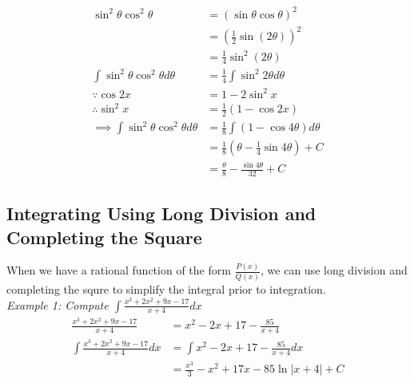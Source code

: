 \documentclass{article}
\begin{document}
        \begin{align*}
            \sin^2{\theta}\cos^2{\theta}                     &= (\sin{\theta}\cos{\theta})^2 \\
                                                             &= \left(\frac{1}{2}\sin{(2\theta)}\right)^2 \\
                                                             &= \frac{1}{4}\sin^2{(2\theta)} \\
            \int\sin^2{\theta}\cos^2{\theta}d\theta          &= \frac{1}{4}\int\sin^2{2\theta}d\theta \\
            \because \cos{2x}                                &= 1-2\sin^2{x} \\
            \therefore \sin^2{x}                             &=\frac{1}{2}(1-\cos{2x}) \\
            \implies \int\sin^2{\theta}\cos^2{\theta}d\theta &= \frac{1}{8}\int(1-\cos{4\theta})d\theta \\
                                                             &= \frac{1}{8}\left(\theta-\frac{1}{4}\sin{4\theta}\right)+C \\
                                                             &= \frac{\theta}{8}-\frac{\sin{4\theta}}{32}+C
        \end{align*}


        \pagebreak
        \subsection{Integrating Using Long Division and Completing the Square}
            When we have a rational function of the form $\frac{P(x)}{Q(x)}$, we can use long
            division and completing the squre to simplify the integral prior to integration. \\

            \noindent \color{blue} \textit{Example 1: Compute $\int\frac{x^3+2x^2+9x-17}{x+4}dx$} \color{black} \\

            \begin{align*}
                \frac{x^3+2x^2+9x-17}{x+4}          &= x^2-2x+17-\frac{85}{x+4} \\
                \int\frac{x^3+2x^2+9x-17}{x+4}dx    &= \int x^2-2x+17-\frac{85}{x+4}dx \\
                                                    &= \frac{x^3}{3}-x^2+17x-85\ln{|x+4|}+C
            \end{align*}
\end{document}
